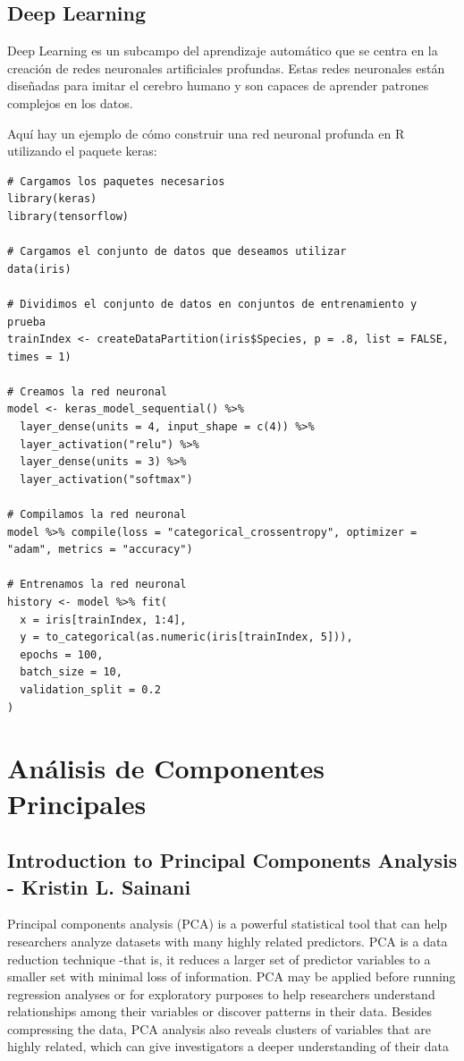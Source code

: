 \documentclass[12pt]{article}
\begin{document}
\subsection{Deep Learning}

Deep Learning es un subcampo del aprendizaje automático que se centra en la creación de redes neuronales artificiales profundas. Estas redes neuronales están diseñadas para imitar el cerebro humano y son capaces de aprender patrones complejos en los datos.

Aquí hay un ejemplo de cómo construir una red neuronal profunda en R utilizando el paquete keras:

\begin{verbatim}
# Cargamos los paquetes necesarios
library(keras)
library(tensorflow)

# Cargamos el conjunto de datos que deseamos utilizar
data(iris)

# Dividimos el conjunto de datos en conjuntos de entrenamiento y prueba
trainIndex <- createDataPartition(iris$Species, p = .8, list = FALSE, times = 1)

# Creamos la red neuronal
model <- keras_model_sequential() %>% 
  layer_dense(units = 4, input_shape = c(4)) %>% 
  layer_activation("relu") %>% 
  layer_dense(units = 3) %>% 
  layer_activation("softmax")

# Compilamos la red neuronal
model %>% compile(loss = "categorical_crossentropy", optimizer = "adam", metrics = "accuracy")

# Entrenamos la red neuronal
history <- model %>% fit(
  x = iris[trainIndex, 1:4],
  y = to_categorical(as.numeric(iris[trainIndex, 5])),
  epochs = 100,
  batch_size = 10,
  validation_split = 0.2
)
\end{verbatim}

\section{An\'alisis de Componentes Principales}

\subsection{Introduction to Principal Components Analysis - Kristin L.  Sainani}
Principal components analysis (PCA) is a powerful statistical tool that can help researchers analyze datasets with many highly related predictors. PCA is a data reduction technique -that is, it reduces a larger set of predictor variables to a smaller set with minimal loss of information. PCA may be applied before running regression analyses or for exploratory purposes to help researchers understand relationships among their variables or discover patterns in their data.  Besides compressing the data, PCA analysis also reveals clusters of variables that are highly related, which can give investigators a deeper understanding of their data
\end{document}
